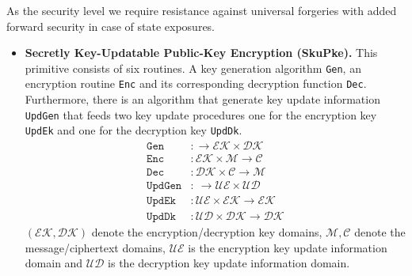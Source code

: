 \documentclass[11pt,a4paper,twoside,openright,bibliography=totoc]{scrbook}
\begin{document}
As the security level we require resistance against universal forgeries
with added forward security in case of state exposures.

\begin{itemize}
\item \textbf{Secretly Key-Updatable Public-Key Encryption (SkuPke).} This
  primitive consists of six routines. A key generation algorithm \texttt{Gen},
  an encryption routine \texttt{Enc} and its corresponding decryption function
  \texttt{Dec}. Furthermore, there is an algorithm that generate key update
  information \texttt{UpdGen} that feeds two key update procedures
  one for the encryption key \texttt{UpdEk} and one for the
  decryption key \texttt{UpdDk}.
  \begin{align*}
    \texttt{Gen} & : \rightarrow \mathcal{EK} \times \mathcal{DK} \\
    \texttt{Enc} & : \mathcal{EK} \times \mathcal{M} \rightarrow \mathcal{C} \\
    \texttt{Dec} & : \mathcal{DK} \times \mathcal{C} \rightarrow \mathcal{M} \\
    \texttt{UpdGen} & : \ \rightarrow \mathcal{UE} \times \mathcal{UD} \\
    \texttt{UpdEk} & : \mathcal{UE} \times \mathcal{EK} \rightarrow \mathcal{EK} \\
    \texttt{UpdDk} & :  \mathcal{UD} \times \mathcal{DK} \rightarrow \mathcal{DK}
  \end{align*}
  $(\mathcal{EK},\mathcal{DK})$ denote the encryption/decryption key domains,
  $\mathcal{M},\mathcal{C}$ denote the message/ciphertext domains, $\mathcal{UE}$
  is the encryption key update information domain and $\mathcal{UD}$ is the
  decryption key update information domain.
\end{itemize}
\end{document}
